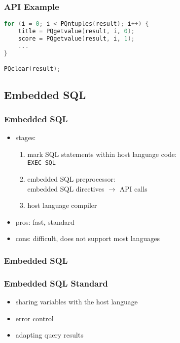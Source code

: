 \documentclass[dvipsnames]{beamer}
\theoremstyle{plain}
\begin{document}
\begin{frame}[fragile]
  \frametitle{API Example}

  \begin{example}
    \begin{lstlisting}[language=C]
for (i = 0; i < PQntuples(result); i++) {
    title = PQgetvalue(result, i, 0);
    score = PQgetvalue(result, i, 1);
    ...
}

PQclear(result);
    \end{lstlisting}
  \end{example}
\end{frame}

\subsection{Embedded SQL}

\begin{frame}
  \frametitle{Embedded SQL}

  \begin{itemize}
    \item stages:
    \begin{enumerate}
      \item mark SQL statements within host language code:\\
        \lstinline!EXEC SQL!
      \item embedded SQL preprocessor:\\
        embedded SQL directives $\rightarrow$ API calls
      \item host language compiler
    \end{enumerate}

    \pause
    \bigskip
    \item pros: fast, standard
    \item cons: difficult, does not support most languages

    \bigskip
    \hyperlink{odbc}{}
  \end{itemize}
\end{frame}

\begin{frame}
  \frametitle{Embedded SQL}

  \begin{center}
  \end{center}
\end{frame}

\begin{frame}
  \frametitle{Embedded SQL Standard}

  \begin{itemize}
    \item sharing variables with the host language
    \item error control
    \item adapting query results
  \end{itemize}
\end{frame}
\end{document}
